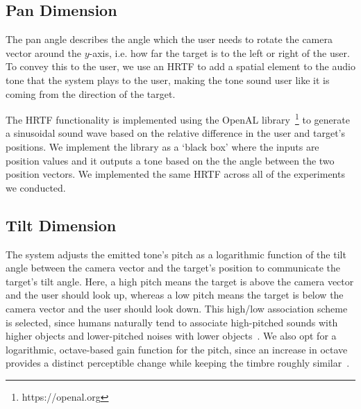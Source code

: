 \documentclass[format=sigconf, review=true, screen=true, anonymous=true]{acmart}
\begin{document}
\subsection{Pan Dimension}

The pan angle describes the angle which the user needs to rotate the camera vector around the $y$-axis, i.e. how far the target is to the left or right of the user. To convey this to the user, we use an HRTF to add a spatial element to the audio tone that the system plays to the user, making the tone sound user like it is coming from the direction of the target. 

The HRTF functionality is implemented using the OpenAL library~\footnote{https://openal.org} to generate a sinusoidal sound wave based on the relative difference in the user and target's positions. We implement the library as a `black box' where the inputs are position values and it outputs a tone based on the the angle between the two position vectors. We implemented the same HRTF across all of the experiments we conducted.  



\subsection{Tilt Dimension}

The system adjusts the emitted tone's pitch as a logarithmic function of the tilt angle between the camera vector and the target's position to communicate the target's tilt angle. Here, a high pitch means the target is above the camera vector and the user should look up, whereas a low pitch means the target is below the camera vector and the user should look down. This high/low association scheme is selected, since humans naturally tend to associate high-pitched sounds with higher objects and lower-pitched noises with lower objects~\cite{pratt1930spatial}. We also opt for a logarithmic, octave-based gain function for the pitch, since an increase in octave provides a distinct perceptible change while keeping the timbre roughly similar~\cite{shepard1964circularity}.
\end{document}
